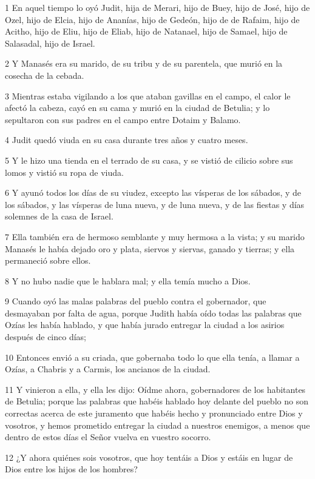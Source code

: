 \par 1 En aquel tiempo lo oyó Judit, hija de Merari, hijo de Buey, hijo de José, hijo de Ozel, hijo de Elcia, hijo de Ananías, hijo de Gedeón, hijo de de Rafaim, hijo de Acitho, hijo de Eliu, hijo de Eliab, hijo de Natanael, hijo de Samael, hijo de Salasadal, hijo de Israel.
\par 2 Y Manasés era su marido, de su tribu y de su parentela, que murió en la cosecha de la cebada.
\par 3 Mientras estaba vigilando a los que ataban gavillas en el campo, el calor le afectó la cabeza, cayó en su cama y murió en la ciudad de Betulia; y lo sepultaron con sus padres en el campo entre Dotaim y Balamo.
\par 4 Judit quedó viuda en su casa durante tres años y cuatro meses.
\par 5 Y le hizo una tienda en el terrado de su casa, y se vistió de cilicio sobre sus lomos y vistió su ropa de viuda.
\par 6 Y ayunó todos los días de su viudez, excepto las vísperas de los sábados, y de los sábados, y las vísperas de luna nueva, y de luna nueva, y de las fiestas y días solemnes de la casa de Israel.
\par 7 Ella también era de hermoso semblante y muy hermosa a la vista; y su marido Manasés le había dejado oro y plata, siervos y siervas, ganado y tierras; y ella permaneció sobre ellos.
\par 8 Y no hubo nadie que le hablara mal; y ella temía mucho a Dios.
\par 9 Cuando oyó las malas palabras del pueblo contra el gobernador, que desmayaban por falta de agua, porque Judith había oído todas las palabras que Ozías les había hablado, y que había jurado entregar la ciudad a los asirios después de cinco días;
\par 10 Entonces envió a su criada, que gobernaba todo lo que ella tenía, a llamar a Ozías, a Chabris y a Carmis, los ancianos de la ciudad.
\par 11 Y vinieron a ella, y ella les dijo: Oídme ahora, gobernadores de los habitantes de Betulia; porque las palabras que habéis hablado hoy delante del pueblo no son correctas acerca de este juramento que habéis hecho y pronunciado entre Dios y vosotros, y hemos prometido entregar la ciudad a nuestros enemigos, a menos que dentro de estos días el Señor vuelva en vuestro socorro.
\par 12 ¿Y ahora quiénes sois vosotros, que hoy tentáis a Dios y estáis en lugar de Dios entre los hijos de los hombres?
